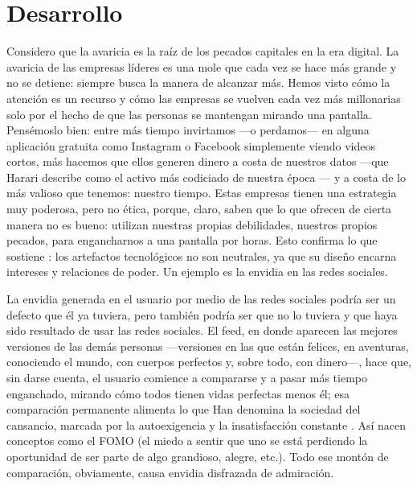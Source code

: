 \section{Desarrollo}

 Considero que la avaricia es la raíz de los pecados capitales en la era digital. La avaricia de las empresas líderes es una mole que cada vez se hace más grande y no se detiene: siempre busca la manera de alcanzar más. Hemos visto cómo la atención es un recurso y cómo las empresas se vuelven cada vez más millonarias solo por el hecho de que las personas se mantengan mirando una pantalla. Pensémoslo bien: entre más tiempo invirtamos —o perdamos— en alguna aplicación gratuita como Instagram o Facebook simplemente viendo videos cortos, más hacemos que ellos generen dinero a costa de nuestros datos —que Harari describe como el activo más codiciado de nuestra época \parencite{harari2017}— y a costa de lo más valioso que tenemos: nuestro tiempo. Estas empresas tienen una estrategia muy poderosa, pero no ética, porque, claro, saben que lo que ofrecen de cierta manera no es bueno: utilizan nuestras propias debilidades, nuestros propios pecados, para engancharnos a una pantalla por horas. Esto confirma lo que sostiene \textcite{winner1980}: los artefactos tecnológicos no son neutrales, ya que su diseño encarna intereses y relaciones de poder. Un ejemplo es la envidia en las redes sociales.

La envidia generada en el usuario por medio de las redes sociales podría ser un defecto que él ya tuviera, pero también podría ser que no lo tuviera y que haya sido resultado de usar las redes sociales. El feed, en donde aparecen las mejores versiones de las demás personas —versiones en las que están felices, en aventuras, conociendo el mundo, con cuerpos perfectos y, sobre todo, con dinero—, hace que, sin darse cuenta, el usuario comience a compararse y a pasar más tiempo enganchado, mirando cómo todos tienen vidas perfectas menos él; esa comparación permanente alimenta lo que Han denomina la sociedad del cansancio, marcada por la autoexigencia y la insatisfacción constante \parencite{han2012}. Así nacen conceptos como el FOMO (el miedo a sentir que uno se está perdiendo la oportunidad de ser parte de algo grandioso, alegre, etc.). Todo ese montón de comparación, obviamente, causa envidia disfrazada de admiración.


